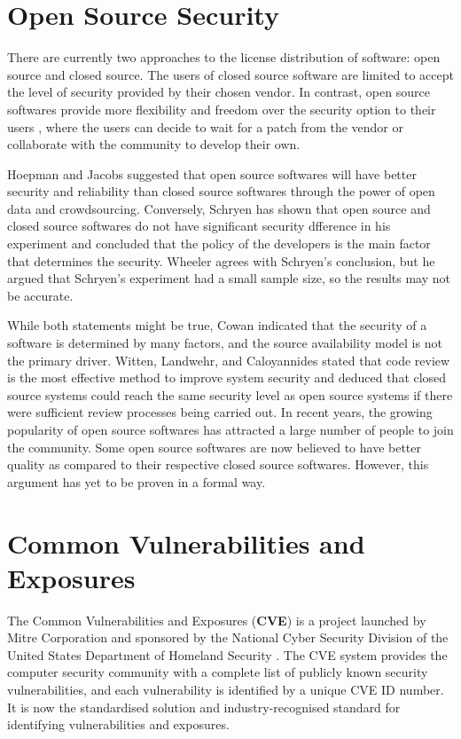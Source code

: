 \documentclass[12pt, a4paper]{report}
\begin{document}
\section{Open Source Security}
There are currently two approaches to the license distribution of software: open source and closed
source. The users of closed source software are limited to accept the level of security
provided by their chosen vendor. In contrast, open source softwares provide more flexibility and
freedom over the security option to their users \cite{payne_2002}, where the users can decide to
wait for a patch from the vendor or collaborate with the community to develop their own.

Hoepman and Jacobs \cite{hoepman_2007} suggested that open source softwares will have better
security and reliability than closed source softwares through the power of open data and
crowdsourcing. Conversely, Schryen \cite{schryen_2011} has shown that open source and closed source
softwares do not have significant security dfference in his experiment and concluded that the policy
of the developers is the main factor that determines the security. Wheeler \cite{wheeler_2015}
agrees with Schryen's conclusion, but he argued that Schryen's experiment had a small sample size,
so the results may not be accurate.

While both statements might be true, Cowan \cite{cowan_2003} indicated that the security of a
software is determined by many factors, and the source availability model is not the primary driver.
Witten, Landwehr, and Caloyannides \cite{witten_2001} stated that code review is the most effective
method to improve system security and deduced that closed source systems could reach the same
security level as open source systems if there were sufficient review processes being carried out.
In recent years, the growing popularity of open source softwares has attracted a large number of
people to join the community. Some open source softwares are now believed to have better quality as
compared to their respective closed source softwares. However, this argument has yet to be proven in
a formal way.

\section{Common Vulnerabilities and Exposures}
The Common Vulnerabilities and Exposures (\textbf{CVE}) is a project launched by Mitre Corporation
and sponsored by the National Cyber Security Division of the United States Department of Homeland
Security \cite{cve}. The CVE system provides the computer security community with a complete list of
publicly known security vulnerabilities, and each vulnerability is identified by a unique CVE ID
number. It is now the standardised solution and industry-recognised standard for identifying
vulnerabilities and exposures.
\end{document}
